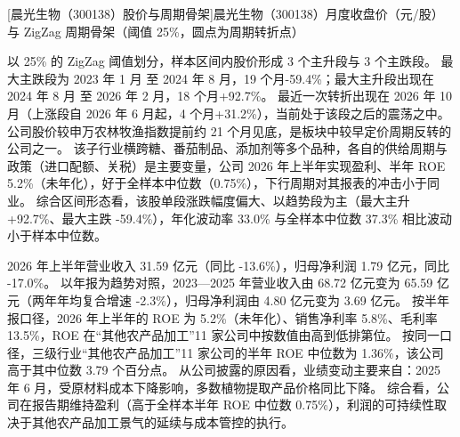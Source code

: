 \begin{center}
\begin{minipage}{\textwidth}\centering
{}

[晨光生物（300138）股价与周期骨架]{晨光生物（300138）月度收盘价（元/股）与 ZigZag 周期骨架（阈值 25\%，圆点为周期转折点）}
\end{minipage}
\end{center}

 以 25\% 的 ZigZag 阈值划分，样本区间内股价形成 3 个主升段与 3 个主跌段。 最大主跌段为 2023 年 1 月 至 2024 年 8 月，19 个月-59.4\%；最大主升段出现在 2024 年 8 月 至 2026 年 2 月，18 个月+92.7\%。 最近一次转折出现在 2026 年 10 月（上涨段自 2026 年 6 月起，4 个月+31.2\%），当前处于该段之后的震荡之中。 公司股价较申万农林牧渔指数提前约 21 个月见底，是板块中较早定价周期反转的公司之一。 该子行业横跨糖、番茄制品、添加剂等多个品种，各自的供给周期与政策（进口配额、关税）是主要变量，公司 2026 年上半年实现盈利、半年 ROE 5.2\%（未年化），好于全样本中位数（0.75\%），下行周期对其报表的冲击小于同业。 综合区间形态看，该股单段涨跌幅度偏大、以趋势段为主（最大主升 +92.7\%、最大主跌 -59.4\%），年化波动率 33.0\% 与全样本中位数 37.3\% 相比波动小于样本中位数。

 2026 年上半年营业收入 31.59 亿元（同比 -13.6\%），归母净利润 1.79 亿元，同比 -17.0\%。 以年报为趋势对照，2023---2025 年营业收入由 68.72 亿元变为 65.59 亿元（两年年均复合增速 -2.3\%），归母净利润由 4.80 亿元变为 3.69 亿元。 按半年报口径，2026 年上半年的 ROE 为 5.2\%（未年化）、销售净利率 5.8\%、毛利率 13.5\%，ROE 在“其他农产品加工”11 家公司中按数值由高到低排第位。 按同一口径，三级行业“其他农产品加工”11 家公司的半年 ROE 中位数为 1.36\%，该公司高于其中位数 3.79 个百分点。 从公司披露的原因看，业绩变动主要来自：2025 年 6 月，受原材料成本下降影响，多数植物提取产品价格同比下降。 综合看，公司在报告期维持盈利（高于全样本半年 ROE 中位数 0.75\%），利润的可持续性取决于其他农产品加工景气的延续与成本管控的执行。

